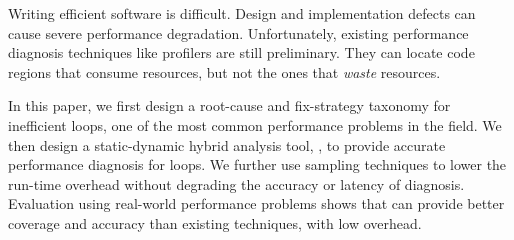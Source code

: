 Writing efficient software is difficult.
Design and implementation defects can
cause severe performance 
degradation. 
Unfortunately, existing performance diagnosis techniques like profilers are still preliminary.
They can locate code regions that consume resources, but 
not the ones that \textit{waste} resources.

In this paper, we first design a root-cause
and fix-strategy taxonomy for inefficient loops, 
one of the most common performance problems in the field.
We then design a static-dynamic hybrid analysis tool, \Tool, to
provide accurate performance diagnosis for loops.
We further use sampling techniques to lower the run-time overhead without
degrading the accuracy or latency of \Tool diagnosis. 
Evaluation using real-world performance
problems shows that \Tool can provide better coverage and accuracy than
existing techniques, with low overhead.
